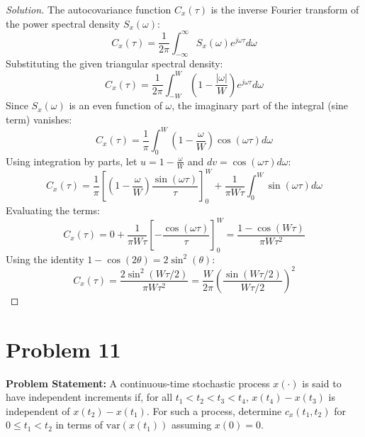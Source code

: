 \documentclass{article}
\begin{document}
\begin{proof}[Solution]
	The autocovariance function $C_x(\tau)$ is the inverse Fourier transform of the power spectral density $S_x(\omega)$:
	\[ C_x(\tau) = \frac{1}{2\pi} \int_{-\infty}^{\infty} S_x(\omega) e^{j\omega \tau} d\omega \]
	Substituting the given triangular spectral density:
	\[ C_x(\tau) = \frac{1}{2\pi} \int_{-W}^{W} \left( 1 - \frac{|\omega|}{W} \right) e^{j\omega \tau} d\omega \]
	Since $S_x(\omega)$ is an even function of $\omega$, the imaginary part of the integral (sine term) vanishes:
	\[ C_x(\tau) = \frac{1}{\pi} \int_{0}^{W} \left( 1 - \frac{\omega}{W} \right) \cos(\omega \tau) d\omega \]
	Using integration by parts, let $u = 1 - \frac{\omega}{W}$ and $dv = \cos(\omega \tau) d\omega$:
	\[ C_x(\tau) = \frac{1}{\pi} \left[ \left( 1 - \frac{\omega}{W} \right) \frac{\sin(\omega \tau)}{\tau} \right]_0^W + \frac{1}{\pi W \tau} \int_0^W \sin(\omega \tau) d\omega \]
	Evaluating the terms:
	\[ C_x(\tau) = 0 + \frac{1}{\pi W \tau} \left[ -\frac{\cos(\omega \tau)}{\tau} \right]_0^W = \frac{1 - \cos(W\tau)}{\pi W \tau^2} \]
	Using the identity $1 - \cos(2\theta) = 2 \sin^2(\theta)$:
	\[ C_x(\tau) = \frac{2 \sin^2(W\tau / 2)}{\pi W \tau^2} = \frac{W}{2\pi} \left( \frac{\sin(W\tau / 2)}{W\tau / 2} \right)^2 \]
\end{proof}

\section*{Problem 11}
\textbf{Problem Statement:}
A continuous-time stochastic process $x(\cdot)$ is said to have independent increments if, for all $t_1 < t_2 < t_3 < t_4$, $x(t_4) - x(t_3)$ is independent of $x(t_2) - x(t_1)$. For such a process, determine $c_x(t_1, t_2)$ for $0 \le t_1 < t_2$ in terms of $\text{var}(x(t_1))$ assuming $x(0) = 0$.
\end{document}
